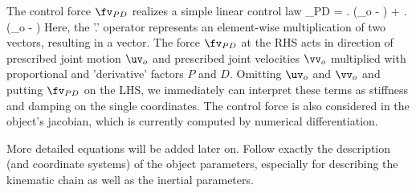     The control force $\fv_{PD}$ realizes a simple linear control law
    \be
      \fv_{PD} = \Pm . (\uv_o - \qv) + \Dm . (\vv_o - \dot \qv)
    \ee
    Here, the '.' operator represents an element-wise multiplication of two vectors, resulting in a vector.
    The force $\fv_{PD}$ at the \ac{RHS} acts in direction of prescribed joint motion $\uv_o$ and
    prescribed joint velocities $\vv_o$ multiplied with proportional and 'derivative' factors $P$ and $D$.
    Omitting $\uv_o$ and $\vv_o$ and putting $\fv_{PD}$ on the \ac{LHS}, we immediately can interpret these
    terms as stiffness and damping on the single coordinates.
    The control force is also considered in the object's jacobian, which is currently computed by numerical
    differentiation.
        
    More detailed equations will be added later on. Follow exactly the description (and coordinate systems) of the object parameters,
    especially for describing the kinematic chain as well as the inertial parameters.


